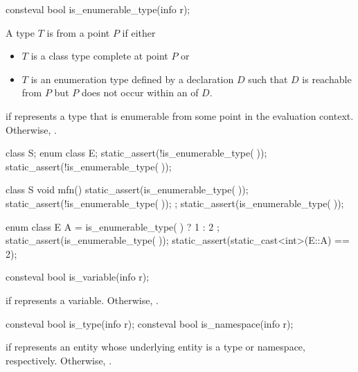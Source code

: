 %
\begin{itemdecl}
consteval bool is_enumerable_type(info r);
\end{itemdecl}

\begin{itemdescr}
\pnum
A type $T$ is  from a point $P$ if either
\begin{itemize}
\item
  $T$ is a class type complete at point $P$ or
\item
  $T$ is an enumeration type defined by a declaration $D$
  such that $D$ is reachable from $P$
  but $P$ does not occur within an  of $D$.
\end{itemize}

\pnum
\returns
{} if  represents a type that is enumerable
from some point in the evaluation context.
Otherwise, .
\begin{example}
\begin{codeblock}
class S;
enum class E;
static_assert(!is_enumerable_type(^^S));
static_assert(!is_enumerable_type(^^E));

class S {
  void mfn() {
    static_assert(is_enumerable_type(^^S));
  }
  static_assert(!is_enumerable_type(^^S));
};
static_assert(is_enumerable_type(^^S));

enum class E {
  A = is_enumerable_type(^^E) ? 1 : 2
};
static_assert(is_enumerable_type(^^E));
static_assert(static_cast<int>(E::A) == 2);
\end{codeblock}
\end{example}
\end{itemdescr}

%
\begin{itemdecl}
consteval bool is_variable(info r);
\end{itemdecl}

\begin{itemdescr}
\pnum
\returns
{} if  represents a variable.
Otherwise, .
\end{itemdescr}

%
%
\begin{itemdecl}
consteval bool is_type(info r);
consteval bool is_namespace(info r);
\end{itemdecl}

\begin{itemdescr}
\pnum
\returns
{} if  represents an entity
whose underlying entity is a type or namespace, respectively.
Otherwise, .
\end{itemdescr}

